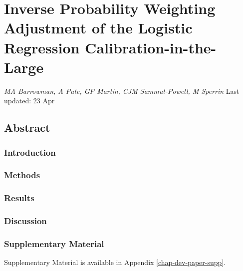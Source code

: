 \documentclass[12pt,PhD,twoside,openright]{muthesis}
\begin{document}
\hypertarget{chap-IPCW-logistic}{%
\chapter{Inverse Probability Weighting Adjustment of the Logistic Regression Calibration-in-the-Large}\label{chap-IPCW-logistic}}

\emph{MA Barrowman, A Pate, GP Martin, CJM Sammut-Powell, M Sperrin}
Last updated: 23 Apr

\hypertarget{abstract-1}{%
\section*{Abstract}\label{abstract-1}}

\hypertarget{introduction-3}{%
\subsection*{Introduction}\label{introduction-3}}

\hypertarget{methods-3}{%
\subsection*{Methods}\label{methods-3}}

\hypertarget{results-2}{%
\subsection*{Results}\label{results-2}}

\hypertarget{discussion-1}{%
\subsection*{Discussion}\label{discussion-1}}

\hypertarget{supplementary-material-1}{%
\subsection*{Supplementary Material}\label{supplementary-material-1}}

Supplementary Material is available in Appendix \ref{chap-dev-paper-supp}.
\end{document}
